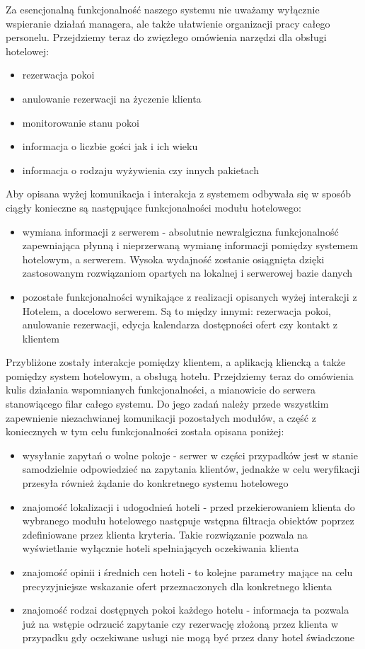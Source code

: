 \documentclass{article}
\begin{document}
\indent \indent Za esencjonalną funkcjonalność naszego systemu nie uważamy wyłącznie wspieranie działań managera, ale także ułatwienie organizacji pracy całego personelu. Przejdziemy teraz do zwięzłego omówienia narzędzi dla obsługi hotelowej:
\begin{itemize}
    \item rezerwacja pokoi 
    \item anulowanie rezerwacji na życzenie klienta
    \item monitorowanie stanu pokoi 
    \item informacja o liczbie gości jak i ich wieku
    \item informacja o rodzaju wyżywienia czy innych pakietach
\end{itemize}
\indent \indent Aby opisana wyżej komunikacja i interakcja z systemem odbywała się w sposób ciągły konieczne są następujące funkcjonalności modułu hotelowego:
\begin{itemize}
    \item wymiana informacji z serwerem - absolutnie newralgiczna funkcjonalność zapewniająca płynną i nieprzerwaną wymianę informacji pomiędzy systemem hotelowym, a serwerem. Wysoka wydaj\-ność zostanie osiągnięta dzięki zastosowanym rozwiązaniom opartych na lokalnej i serwerowej bazie danych
    \item pozostałe funkcjonalności wynikające z realizacji opisanych wyżej interakcji z Hotelem, a docelowo serwerem. Są to między innymi: rezerwacja pokoi, anulowanie rezerwacji, edycja kalendarza dostępności ofert czy kontakt z klientem  
\end{itemize}
\indent \indent Przybliżone zostały interakcje pomiędzy klientem, a aplikacją kliencką a także pomiędzy system hotelowym, a obsługą hotelu. Przejdziemy teraz do omówienia kulis działania wspomnianych funkcjo\-nalności, a mianowicie do serwera stanowiącego filar całego systemu. Do jego zadań należy przede wszystkim zapewnienie niezachwianej komunikacji pozostałych modułów, a część z koniecznych w tym celu funkcjonalności została opisana poniżej:
\begin{itemize}
    \item wysyłanie zapytań o wolne pokoje - serwer w części przypadków jest w stanie samodzielnie odpowiedzieć na zapytania klientów, jednakże w celu weryfikacji przesyła również żądanie do konkretnego systemu hotelowego
    \item znajomość lokalizacji i udogodnień hoteli - przed przekierowaniem klienta do wybranego modułu hotelowego następuje wstępna filtracja obiektów poprzez zdefiniowane przez klienta kryteria. Takie rozwiązanie pozwala na wyświetlanie wyłącznie hoteli spełniających oczekiwania klienta
    \item znajomość opinii i średnich cen hoteli - to kolejne parametry mające na celu precyzyjniejsze wskazanie ofert przeznaczonych dla konkretnego klienta
    \item znajomość rodzai dostępnych pokoi każdego hotelu - informacja ta pozwala już na wstępie odrzucić zapytanie czy rezerwację złożoną przez klienta w przypadku gdy oczekiwane usługi nie mogą być przez dany hotel świadczone
\end{itemize}
\newpage
\end{document}
